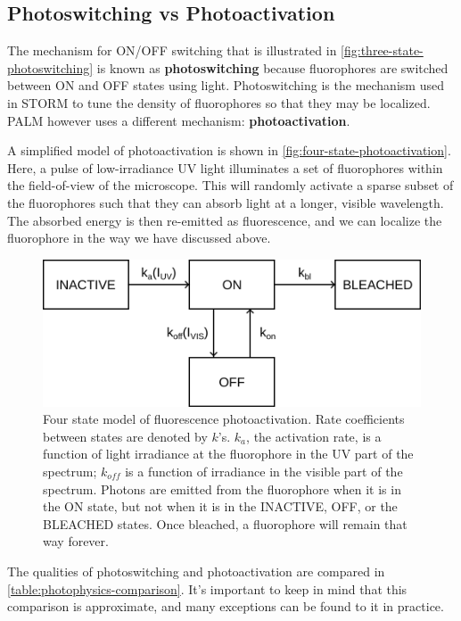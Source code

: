 \documentclass[10pt,a4paper,oneside]{book}
\begin{document}
\subsection{Photoswitching vs Photoactivation}

The mechanism for ON/OFF switching that is illustrated in \autoref{fig:three-state-photoswitching} is known as \textbf{photoswitching} because fluorophores are switched between ON and OFF states using light. Photoswitching is the mechanism used in STORM to tune the density of fluorophores so that they may be localized. PALM however uses a different mechanism: \textbf{photoactivation}.

A simplified model of photoactivation is shown in \autoref{fig:four-state-photoactivation}. Here, a pulse of low-irradiance UV light illuminates a set of fluorophores within the field-of-view of the microscope. This will randomly activate a sparse subset of the fluorophores such that they can absorb light at a longer, visible wavelength. The absorbed energy is then re-emitted as fluorescence, and we can localize the fluorophore in the way we have discussed above.

\begin{figure}[ht]
    \centering
    \includegraphics{four-state-photoactivation-model.png}
    \caption{Four state model of fluorescence photoactivation. Rate coefficients between states are denoted by $k$'s. $k_a$, the activation rate, is a function of light irradiance at the fluorophore in the UV part of the spectrum; $k_{off}$ is a function of irradiance in the visible part of the spectrum. Photons are emitted from the fluorophore when it is in the ON state, but not when it is in the INACTIVE, OFF, or the BLEACHED states. Once bleached, a fluorophore will remain that way forever.}
    \label{fig:four-state-photoactivation}
\end{figure}

The qualities of photoswitching and photoactivation are compared in \autoref{table:photophysics-comparison}. It's important to keep in mind that this comparison is approximate, and many exceptions can be found to it in practice.
\end{document}
